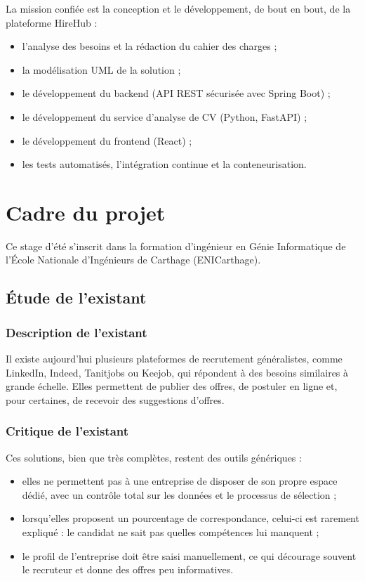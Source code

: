 \documentclass[12pt,a4paper]{report}
\begin{document}
La mission confiée est la conception et le développement, de bout en bout, de la plateforme HireHub :
\begin{itemize}
  \item l'analyse des besoins et la rédaction du cahier des charges ;
  \item la modélisation UML de la solution ;
  \item le développement du backend (API REST sécurisée avec Spring Boot) ;
  \item le développement du service d'analyse de CV (Python, FastAPI) ;
  \item le développement du frontend (React) ;
  \item les tests automatisés, l'intégration continue et la conteneurisation.
\end{itemize}

\section{Cadre du projet}
Ce stage d'été s'inscrit dans la formation d'ingénieur en Génie Informatique de l'École Nationale d'Ingénieurs de Carthage (ENICarthage).

\subsection{Étude de l'existant}

\subsubsection{Description de l'existant}
Il existe aujourd'hui plusieurs plateformes de recrutement généralistes, comme LinkedIn, Indeed, Tanitjobs ou Keejob, qui répondent à des besoins similaires à grande échelle. Elles permettent de publier des offres, de postuler en ligne et, pour certaines, de recevoir des suggestions d'offres.

\subsubsection{Critique de l'existant}
Ces solutions, bien que très complètes, restent des outils génériques :
\begin{itemize}
  \item elles ne permettent pas à une entreprise de disposer de son propre espace dédié, avec un contrôle total sur les données et le processus de sélection ;
  \item lorsqu'elles proposent un \og pourcentage de correspondance\fg{}, celui-ci est rarement expliqué : le candidat ne sait pas quelles compétences lui manquent ;
  \item le profil de l'entreprise doit être saisi manuellement, ce qui décourage souvent le recruteur et donne des offres peu informatives.
\end{itemize}
\end{document}
